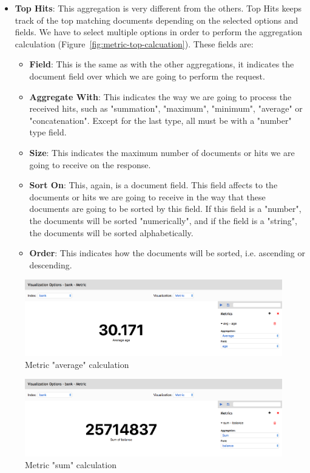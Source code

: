 \documentclass[a4paper, 12pt, english]{book}
\begin{document}
\begin{itemize}
    \item \textbf{Top Hits}: This aggregation is very different from the others. Top Hits keeps track of the top matching documents depending on the selected options and fields. We have to select multiple options in order to perform the aggregation calculation (Figure~\ref{fig:metric-top-calcuation}). These fields are:
    \begin{itemize}
        \item \textbf{Field}: This is the same as with the other aggregations, it indicates the document field over which we are going to perform the request.
        \item \textbf{Aggregate With}: This indicates the way we are going to process the received hits, such as "summation", "maximum", "minimum", "average" or "concatenation". Except for the last type, all must be with a "number" type field.
        \item \textbf{Size}: This indicates the maximum number of documents or hits we are going to receive on the response.
        \item \textbf{Sort On}: This, again, is a document field. This field affects to the documents or hits we are going to receive in the way that these documents are going to be sorted by this field. If this field is a "number", the documents will be sorted "numerically", and if the field is a "string", the documents will be sorted alphabetically.
        \item \textbf{Order}: This indicates how the documents will be sorted, i.e. ascending or descending.
    \end{itemize}
\end{itemize}

\begin{figure}
  \centering
  \includegraphics[width=13cm, keepaspectratio]{img/metric-average-calculation.png}
  \caption{Metric "average" calculation}
  \label{fig:metric-average-calcuation}
\end{figure}

\begin{figure}
  \centering
  \includegraphics[width=13cm, keepaspectratio]{img/metric-sum-calculation.png}
  \caption{Metric "sum" calculation}
  \label{fig:metric-sum-calcuation}
\end{figure}
\end{document}
